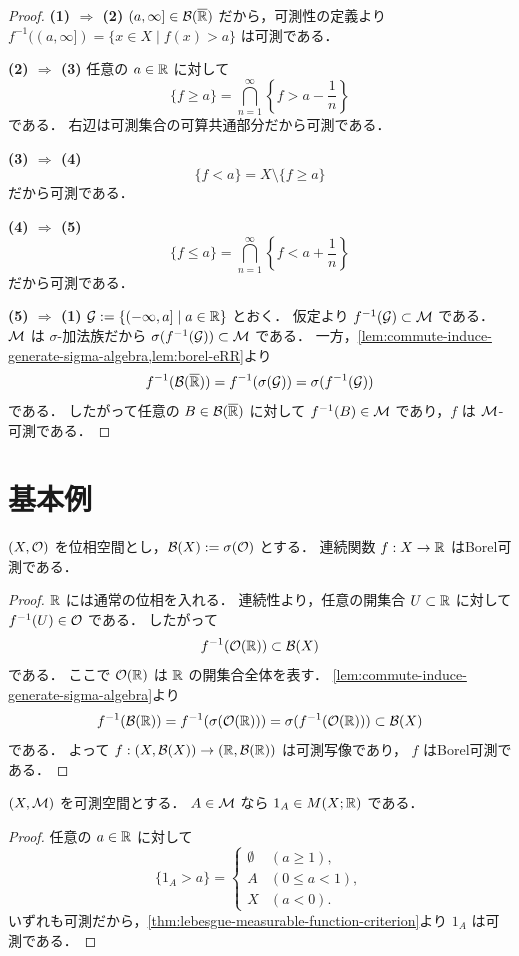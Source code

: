 \begin{proof}
\textbf{(1) $\Rightarrow$ (2)}\quad
$(a,\infty]\in \mathcal B(\overline{\mathbb R})$ だから，可測性の定義より
$f^{-1}((a,\infty])=\{x\in X \mid f(x)>a\}$ は可測である．

\textbf{(2) $\Rightarrow$ (3)}\quad
任意の $a\in\mathbb R$ に対して
\[
\{f\ge a\}
=
\bigcap_{n=1}^{\infty}\left\{f>a-\frac1n\right\}
\]
である．
右辺は可測集合の可算共通部分だから可測である．

\textbf{(3) $\Rightarrow$ (4)}\quad
\[
\{f<a\}=X\setminus\{f\ge a\}
\]
だから可測である．

\textbf{(4) $\Rightarrow$ (5)}\quad
\[
\{f\le a\}
=
\bigcap_{n=1}^{\infty}\left\{f<a+\frac1n\right\}
\]
だから可測である．

\textbf{(5) $\Rightarrow$ (1)}\quad
$\mathcal G:=\{(-\infty,a]\mid a\in\mathbb R\}$
とおく．
仮定より $f^{-1}(\mathcal G)\subset\mathcal M$ である．
$\mathcal M$ は $\sigma$-加法族だから
$\sigma(f^{-1}(\mathcal G))\subset\mathcal M$
である．
一方，\cref{lem:commute-induce-generate-sigma-algebra,lem:borel-eRR}より
\[
f^{-1}(\mathcal B(\overline{\mathbb R}))
=f^{-1}(\sigma(\mathcal G))
=\sigma(f^{-1}(\mathcal G))
\]
である．
したがって任意の $B\in\mathcal B(\overline{\mathbb R})$ に対して
$f^{-1}(B)\in\mathcal M$ であり，$f$ は $\mathcal M$-可測である．
\end{proof}

\section{基本例}

\begin{example}[連続関数]\label{ex:continuous-function-measurable}
$(X,\mathcal O)$ を位相空間とし，$\mathcal B(X):=\sigma(\mathcal O)$ とする．
連続関数 $f:X\to\mathbb R$ はBorel可測である．
\end{example}
\begin{proof}
$\mathbb R$ には通常の位相を入れる．
連続性より，任意の開集合 $U\subset\mathbb R$ に対して
$f^{-1}(U)\in\mathcal O$ である．
したがって
\[
f^{-1}(\mathcal O(\mathbb R))\subset\mathcal B(X)
\]
である．
ここで $\mathcal O(\mathbb R)$ は $\mathbb R$ の開集合全体を表す．
\cref{lem:commute-induce-generate-sigma-algebra}より
\[
f^{-1}(\mathcal B(\mathbb R))
=f^{-1}(\sigma(\mathcal O(\mathbb R)))
=\sigma(f^{-1}(\mathcal O(\mathbb R)))
\subset\mathcal B(X)
\]
である．
よって $f:(X,\mathcal B(X))\to(\mathbb R,\mathcal B(\mathbb R))$ は可測写像であり，
$f$ はBorel可測である．
\end{proof}

\begin{example}[指示関数]\label{ex:indicator-function-measurable}
$(X,\mathcal M)$ を可測空間とする．
$A \in \mathcal M$ なら $1_A\in M(X;\mathbb R)$ である．
\end{example}
\begin{proof}
任意の $a\in\mathbb R$ に対して
\[
\{1_A>a\}
=
\begin{cases}
\emptyset & (a\ge 1),\\
A & (0\le a<1),\\
X & (a<0).
\end{cases}
\]
いずれも可測だから，\cref{thm:lebesgue-measurable-function-criterion}より $1_A$ は可測である．
\end{proof}

